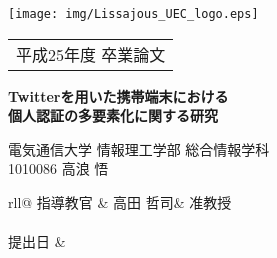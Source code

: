 \thispagestyle{empty}

\noindent
\texttt{[image: img/Lissajous\_UEC\_logo.eps]}\\
\begin{tabular}{c}
{\Large 平成25年度 卒業論文}				\\
\end{tabular}

\vspace{2.5cm}

\begin{center}
\LARGE \bf Twitterを用いた携帯端末における \\
個人認証の多要素化に関する研究 \\
\end{center}

\vspace{1.5cm}

\LARGE
\begin{flushright}
電気通信大学 情報理工学部 総合情報学科\\
1010086 高浪 悟\\

\vspace{1.6zh}

{\def\arraystretch{0.6}
\begin{tabular}{rll@{}}
指導教官	& 高田 哲司& 准教授	\\
							\\
提出日	& 	\\
\end{tabular}
}
\end{flushright}
\normalsize
\newpage

